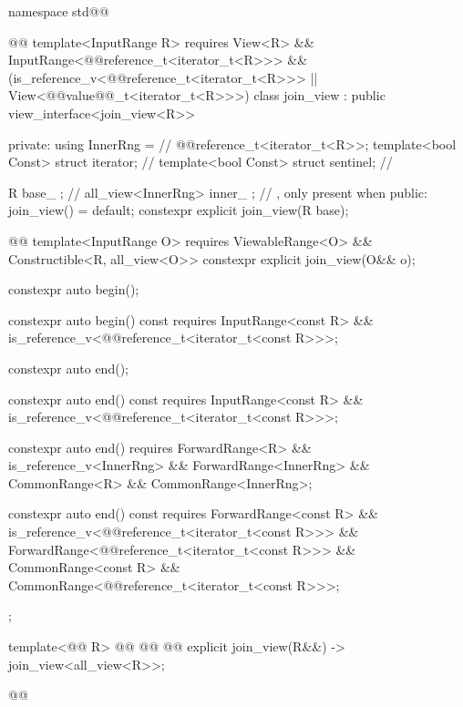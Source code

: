 \begin{codeblock}
namespace std@@ { @@
  template<InputRange R>
    requires View<R> && InputRange<@@reference_t<iterator_t<R>>> &&
      (is_reference_v<@@reference_t<iterator_t<R>>> ||
      View<@@value@@_t<iterator_t<R>>>)
  class join_view : public view_interface<join_view<R>> {
  private:
    using InnerRng =              // \expos
      @@reference_t<iterator_t<R>>;
    template<bool Const>
      struct iterator;            // \expos
    template<bool Const>
      struct sentinel;            // \expos

    R base_ {};                   // \expos
    all_view<InnerRng> inner_ {}; // \expos, only present when 
  public:
    join_view() = default;
    constexpr explicit join_view(R base);

    @@
    template<InputRange O>
        requires ViewableRange<O> && Constructible<R, all_view<O>>
      constexpr explicit join_view(O&& o);

    constexpr auto begin();

    constexpr auto begin() const requires InputRange<const R> &&
      is_reference_v<@@reference_t<iterator_t<const R>>>;

    constexpr auto end();

    constexpr auto end() const requires InputRange<const R> &&
      is_reference_v<@@reference_t<iterator_t<const R>>>;

    constexpr auto end() requires ForwardRange<R> &&
      is_reference_v<InnerRng> && ForwardRange<InnerRng> &&
      CommonRange<R> && CommonRange<InnerRng>;

    constexpr auto end() const requires ForwardRange<const R> &&
      is_reference_v<@@reference_t<iterator_t<const R>>> &&
      ForwardRange<@@reference_t<iterator_t<const R>>> &&
      CommonRange<const R> && CommonRange<@@reference_t<iterator_t<const R>>>;
  };

  template<@@ R>
    @@
      @@
      @@
    explicit join_view(R&&) -> join_view<all_view<R>>;
}@\oldtxt{\}}@
\end{codeblock}

